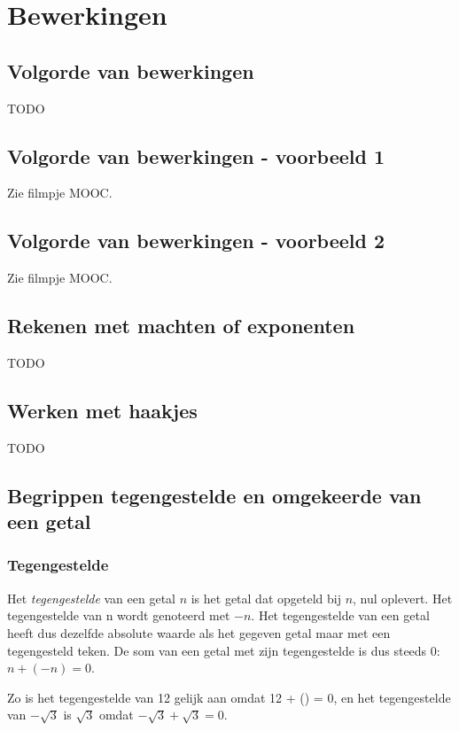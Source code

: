 \section{Bewerkingen}

\subsection{Volgorde van bewerkingen}
TODO

\subsection{Volgorde van bewerkingen - voorbeeld 1}
Zie filmpje MOOC.

\subsection{Volgorde van bewerkingen - voorbeeld 2}
Zie filmpje MOOC.

\subsection{Rekenen met machten of exponenten}
TODO

\subsection{Werken met haakjes}
TODO

\subsection{Begrippen tegengestelde en omgekeerde van een getal}

\subsubsection{Tegengestelde}

Het \emph{tegengestelde} van een getal $n$ is het getal dat opgeteld
bij $n$, nul oplevert. Het tegengestelde van n wordt genoteerd met
$-n$. Het tegengestelde van een getal heeft dus dezelfde absolute
waarde als het gegeven getal maar met een tegengesteld teken. De som
van een getal met zijn tegengestelde is dus steeds 0: $n+(-n)=0$.

\noindent Zo is het tegengestelde van 12 gelijk aan 
omdat 12 + () = 0, en het tegengestelde van $-\sqrt{3}$
is $\sqrt{3}$ omdat $-\sqrt{3}+\sqrt{3}=0$.

\medskip{}


